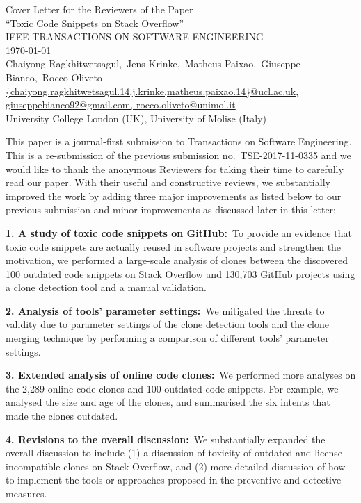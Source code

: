 \documentclass[a4paper,twoside,10pt]{reviewresponse}
\makeatletter
\newcommand{\myAuthors}{Chaiyong Ragkhitwetsagul,~Jens Krinke,~Matheus Paixao,~Giuseppe Bianco,~Rocco Oliveto}
\newcommand{\myEmail}{{chaiyong.ragkhitwetsagul.14,j.krinke,matheus.paixao.14}@ucl.ac.uk, giuseppebianco92@gmail.com, rocco.oliveto@unimol.it}
\newcommand{\myTitle}{Cover Letter for the Reviewers of the Paper \\ ``Toxic Code Snippets on Stack Overflow''}
\newcommand{\myJournal}{IEEE TRANSACTIONS ON SOFTWARE ENGINEERING}
\newcommand{\myDept}{University College London (UK), University of Molise (Italy)}
\makeatother
\begin{document}
\thispagestyle{plain}

\begin{center}
 {\LARGE\myTitle} \vspace{0.3cm} \\
 {\large\myJournal} \vspace{0.3cm} \\
 \today \vspace{0.3cm} \\
 \myAuthors \\
 \url{\myEmail} \\
 \vspace{0.3cm} 
 \myDept \vspace{1cm}
\end{center}


This paper is a journal-first submission to Transactions on Software
Engineering. This is a re-submission of the previous submission
no.~TSE-2017-11-0335 and we would like to thank the anonymous Reviewers for
taking their time to carefully read our paper. With their useful and
constructive reviews, we substantially improved the work by adding three major
improvements as listed below to our previous submission and minor improvements
as discussed later in this letter:

\textbf{1. A study of toxic code snippets on GitHub:}~To provide an evidence
that toxic code snippets are actually reused in software projects and strengthen
the motivation, we performed a large-scale analysis of clones between the
discovered 100 outdated code snippets on Stack Overflow and 130,703 GitHub
projects using a clone detection tool and a manual validation.

\textbf{2. Analysis of tools' parameter settings:}~We mitigated the threats to
validity due to parameter settings of the clone detection tools and the clone
merging technique by performing a comparison of different tools' parameter
settings.

\textbf{3. Extended analysis of online code clones:}~We performed more analyses
on the 2,289 online code clones and 100 outdated code snippets. For example,
we analysed the size and age of the clones, and summarised the six intents that
made the clones outdated.

\textbf{4. Revisions to the overall discussion:}~We substantially expanded the
overall discussion to include (1) a discussion of toxicity of outdated and
license-incompatible clones on Stack Overflow, and (2) more detailed discussion
of how to implement the tools or approaches proposed in the preventive and
detective measures.
\end{document}
